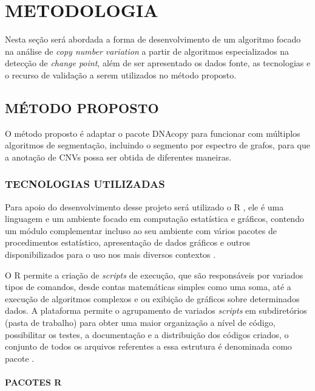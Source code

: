 
\chapter{METODOLOGIA}
\label{chap:metodologia}
Nesta seção será abordada a forma de desenvolvimento de um algoritmo focado na análise de \textit{copy number variation} a partir de algoritmos especializados na detecção de \textit{change point}, além de ser apresentado os dados fonte, as tecnologias e o recurso de validação a serem utilizados no método proposto. 

\section{MÉTODO PROPOSTO} 

O método proposto é adaptar o pacote DNAcopy para funcionar com múltiplos algoritmos de segmentação, incluindo o segmento por espectro de grafos, para que a anotação de CNVs possa ser obtida de diferentes maneiras. 

\subsection{TECNOLOGIAS UTILIZADAS} 

Para apoio do desenvolvimento desse projeto será utilizado o R \cite{Core2019}, ele é uma linguagem e um ambiente focado em computação estatística e gráficos, contendo um módulo complementar incluso ao seu ambiente com vários pacotes de procedimentos estatístico, apresentação de dados gráficos e outros disponibilizados para o uso nos mais diversos contextos \cite{website:Hornik2018}.

O R permite a criação de \textit{scripts} de execução, que são responsáveis por variados tipos de comandos, desde contas matemáticas simples como uma soma, até a execução de algoritmos complexos e ou exibição de gráficos sobre determinados dados. A plataforma permite o agrupamento de variados \textit{scripts} em subdiretórios (pasta de trabalho) para obter uma maior organização a nível de código, possibilitar os testes, a documentação e a distribuição dos códigos criados, o conjunto de todos os arquivos referentes a essa estrutura é denominada como pacote \cite{website:Hornik2018}.

\subsubsection{PACOTES R}

